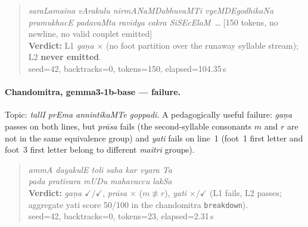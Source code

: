 \documentclass[11pt]{article}
\begin{document}
\begin{quote}
\textit{saraLamaina vArakulu nirmANaMDabhuvaMTi vyeMDEgodhikaNa
pramukhacE pada\-vaMta ravidya cakra SiSEcElaM~\ldots}
[150 tokens, no newline, no valid couplet emitted]
\\
\textbf{Verdict:} L1 \textit{ga\d{n}a} $\times$ (no foot partition over
the runaway syllable stream); L2 \textbf{never emitted}.
\\ {\footnotesize seed=42, backtracks=0, tokens=150, elapsed=104.35\,s}
\end{quote}

\paragraph{Chandomitra, gemma3-1b-base --- failure.}
Topic: \textit{tallI prEma annintikaMTe goppadi}. A pedagogically
useful failure: \textit{ga\d{n}a} passes on both lines, but
\textit{pr\={a}sa} fails (the second-syllable consonants
$m$ and $r$ are not in the same equivalence group) and \textit{yati}
fails on line~1 (foot~1 first letter and foot~3 first letter belong
to different \textit{maitri} groups).

\begin{quote}
\textit{ammA dayakulE toli saha kar vyara Ta} \\
\textit{pada prativara mUDu mahavaccu lakSa} \\
\textbf{Verdict:} \textit{ga\d{n}a} $\checkmark/\checkmark$,
\textit{pr\={a}sa} $\times$ ($m \not\equiv r$),
\textit{yati} $\times/\checkmark$ (L1 fails, L2 passes; aggregate
yati score 50/100 in the chandomitra \texttt{breakdown}).
\\ {\footnotesize seed=42, backtracks=0, tokens=23, elapsed=2.31\,s}
\end{quote}
\end{document}
